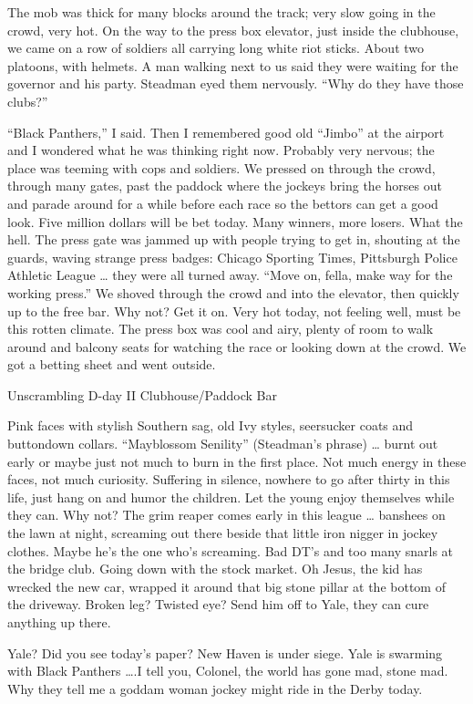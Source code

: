 \documentclass[10pt,a4paper]{article}
\begin{document}
The mob was thick for many blocks around the track; very slow going in the crowd, very hot. On the way to the press box elevator, just inside the clubhouse, we came on a row of soldiers all carrying long white riot sticks. About two platoons, with helmets. A man walking next to us said they were waiting for the governor and his party. Steadman eyed them nervously. “Why do they have those clubs?”

“Black Panthers,” I said. Then I remembered good old “Jimbo” at the airport and I wondered what he was thinking right now. Probably very nervous; the place was teeming with cops and soldiers. We pressed on through the crowd, through many gates, past the paddock where the jockeys bring the horses out and parade around for a while before each race so the bettors can get a good look. Five million dollars will be bet today. Many winners, more losers. What the hell. The press gate was jammed up with people trying to get in, shouting at the guards, waving strange press badges: Chicago Sporting Times, Pittsburgh Police Athletic League … they were all turned away. “Move on, fella, make way for the working press.” We shoved through the crowd and into the elevator, then quickly up to the free bar. Why not? Get it on. Very hot today, not feeling well, must be this rotten climate. The press box was cool and airy, plenty of room to walk around and balcony seats for watching the race or looking down at the crowd. We got a betting sheet and went outside.

Unscrambling D-day II
Clubhouse/Paddock Bar

Pink faces with stylish Southern sag, old Ivy styles, seersucker coats and buttondown collars. “Mayblossom Senility” (Steadman’s phrase) … burnt out early or maybe just not much to burn in the first place. Not much energy in these faces, not much curiosity. Suffering in silence, nowhere to go after thirty in this life, just hang on and humor the children. Let the young enjoy themselves while they can. Why not? The grim reaper comes early in this league … banshees on the lawn at night, screaming out there beside that little iron nigger in jockey clothes. Maybe he’s the one who’s screaming. Bad DT’s and too many snarls at the bridge club. Going down with the stock market. Oh Jesus, the kid has wrecked the new car, wrapped it around that big stone pillar at the bottom of the driveway. Broken leg? Twisted eye? Send him off to Yale, they can cure anything up there.

Yale? Did you see today’s paper? New Haven is under siege. Yale is swarming with Black Panthers ….I tell you, Colonel, the world has gone mad, stone mad. Why they tell me a goddam woman jockey might ride in the Derby today.
\end{document}
